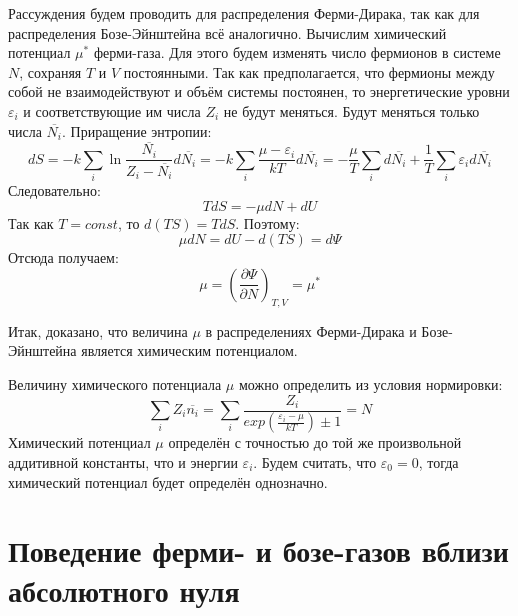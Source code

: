 \documentclass[A4]{article}
\begin{document}
    Рассуждения будем проводить для распределения Ферми-Дирака, так как для распределения Бозе-Эйнштейна
    всё аналогично. Вычислим химический потенциал $\mu^{*}$ ферми-газа. Для этого будем изменять число
    фермионов в системе $N$, сохраняя $T$ и $V$ постоянными. Так как предполагается, что фермионы между
    собой не взаимодействуют и объём системы постоянен, то энергетические уровни $\varepsilon_i$ и
    соответствующие им числа $Z_i$ не будут меняться. Будут меняться только числа $\overline{N_i}$.
    Приращение энтропии:
    \begin{equation*}
        dS = -k\sum\limits_{i} \ln{\frac{\overline{N_i}}{Z_i - \overline{N_i}}}d\overline{N_i} =
        -k\sum\limits_{i} \frac{\mu - \varepsilon_i}{kT} d\overline{N_i} =
        -\frac{\mu}{T}\sum\limits_{i} d\overline{N_i} + \frac{1}{T}\sum\limits_{i}\varepsilon_id\overline{N_i}
    \end{equation*}
    Следовательно:
    \begin{equation*}
        TdS = -\mu dN + dU
    \end{equation*}
    Так как $T = const$, то $d(TS) = TdS$. Поэтому:
    \begin{equation*}
        \mu dN = dU - d(TS) = d\Psi
    \end{equation*}
    Отсюда получаем:
    \begin{equation}
        \mu = \left(\frac{\partial \Psi}{\partial N}\right)_{T, V} = \mu^{*}
    \end{equation}

    Итак, доказано, что величина $\mu$ в распределениях Ферми-Дирака и Бозе-Эйнштейна является
    химическим потенциалом.

    Величину химического потенциала $\mu$ можно определить из условия нормировки:
    \begin{equation*}
        \sum\limits_{i} Z_i \overline{n_i} = \sum\limits_{i}
        \frac{Z_i}{exp\left(\frac{\varepsilon_i - \mu}{kT}\right) \pm 1} = N
    \end{equation*}
    Химический потенциал $\mu$ определён с точностью до той же произвольной аддитивной константы,
    что и энергии $\varepsilon_i$. Будем считать, что $\varepsilon_0 = 0$, тогда химический
    потенциал будет определён однозначно.

\section{Поведение ферми- и бозе-газов вблизи абсолютного нуля}
\end{document}
